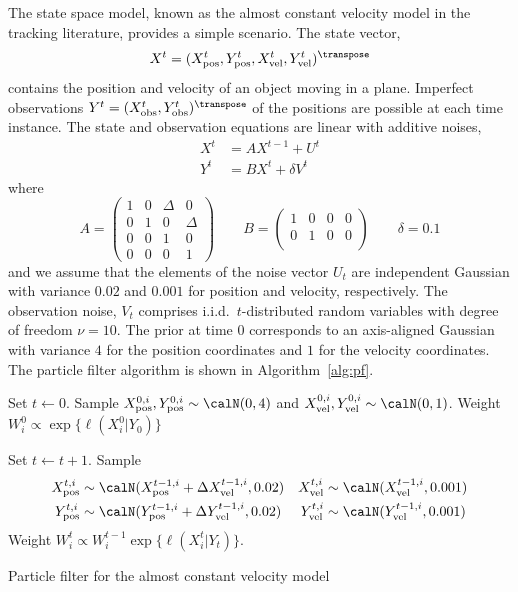 The state space model, known as the almost constant velocity model in the
tracking literature, provides a simple scenario. The state vector,
\begin{equation*}
  X^t = (\xpos^t, \ypos^t, \xvel^t, \yvel^t)^{\transpose}
\end{equation*}
contains the position and velocity of an object moving in a plane. Imperfect
observations $Y^t = (\xobs^t, \yobs^t)^{\transpose}$ of the positions are
possible at each time instance. The state and observation equations are linear
with additive noises,
\begin{align*}
  X^t &= AX^{t-1} + U^t \\
  Y^t &= BX^t + \delta V^t
\end{align*}
where
\begin{equation*}
  A = \begin{pmatrix}
    1 & 0 & \Delta & 0      \\
    0 & 1 & 0      & \Delta \\
    0 & 0 & 1      & 0      \\
    0 & 0 & 0      & 1
  \end{pmatrix} \qquad
  B = \begin{pmatrix}
    1 & 0 & 0 & 0 \\
    0 & 1 & 0 & 0 \\
  \end{pmatrix} \qquad
  \delta = 0.1
\end{equation*}
and we assume that the elements of the noise vector $U_t$ are independent
Gaussian with variance $0.02$ and $0.001$ for position and velocity,
respectively. The observation noise, $V_t$ comprises i.i.d.\ $t$-distributed
random variables with degree of freedom $\nu = 10$. The prior at time $0$
corresponds to an axis-aligned Gaussian with variance $4$ for the position
coordinates and $1$ for the velocity coordinates. The particle filter algorithm
is shown in Algorithm~\ref{alg:pf}.

\begin{algorithm}[t]
  \begin{algorithmic}
    \tophrule
    \STATE {}
    \STATE Set $t\leftarrow0$.
    \STATE Sample $\xpos^{0,i},\ypos^{0,i}\sim\calN(0,4)$ and
    $\xvel^{0,i},\yvel^{0,i}\sim\calN(0,1)$.
    \STATE Weight $W_i^0 \propto \exp\{\ell(X_i^0 \vert Y_0)\}$

    \REPEAT
    \STATE {}
    \STATE Set $t\leftarrow t + 1$.
    \STATE Sample
    \begin{align*}
      \xpos^{t,i}&\sim\calN(\xpos^{t-1,i} + \Delta\xvel^{t-1,i}, 0.02) &
      \xvel^{t,i}&\sim\calN(\xvel^{t-1,i}, 0.001) \\
      \ypos^{t,i}&\sim\calN(\ypos^{t-1,i} + \Delta\yvel^{t-1,i}, 0.02) &
      \yvel^{t,i}&\sim\calN(\yvel^{t-1,i}, 0.001)
    \end{align*}
    \STATE Weight $W_i^t \propto W_i^{t - 1}\exp\{\ell(X_i^t \vert Y_t)\}$.
    \bottomhrule
  \end{algorithmic}
  \caption{Particle filter for the almost constant velocity model}
  \label{alg:pf}
\end{algorithm}


